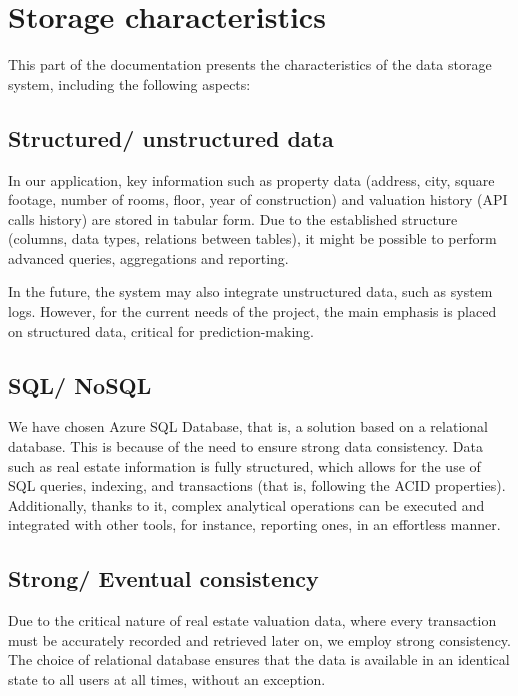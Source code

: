 \documentclass{article}
\begin{document}
\section{Storage characteristics}

This part of the documentation presents the characteristics of the data storage system, including the following aspects:

\subsection{Structured/ unstructured data}

In our application, key information such as property data (address, city, square footage, number of rooms, floor, year of construction) and valuation history (API calls history) are stored in tabular form. Due to the established structure (columns, data types, relations between tables), it might be possible to perform advanced queries, aggregations and reporting.

In the future, the system may also integrate unstructured data, such as system logs. However, for the current needs of the project, the main emphasis is placed on structured data, critical for prediction-making. 

\subsection{SQL/ NoSQL}

We have chosen Azure SQL Database, that is, a solution based on a relational database. This is because of the need to ensure strong data consistency. Data such as real estate information is fully structured, which allows for the use of SQL queries, indexing, and transactions (that is, following the ACID properties). Additionally, thanks to it, complex analytical operations can be executed and integrated with other tools, for instance, reporting ones, in an effortless manner. 


\subsection{Strong/ Eventual consistency}

Due to the critical nature of real estate valuation data, where every transaction must be accurately recorded and retrieved later on, we employ strong consistency. The choice of relational database ensures that the data is available in an identical state to all users at all times, without an exception.
\end{document}
